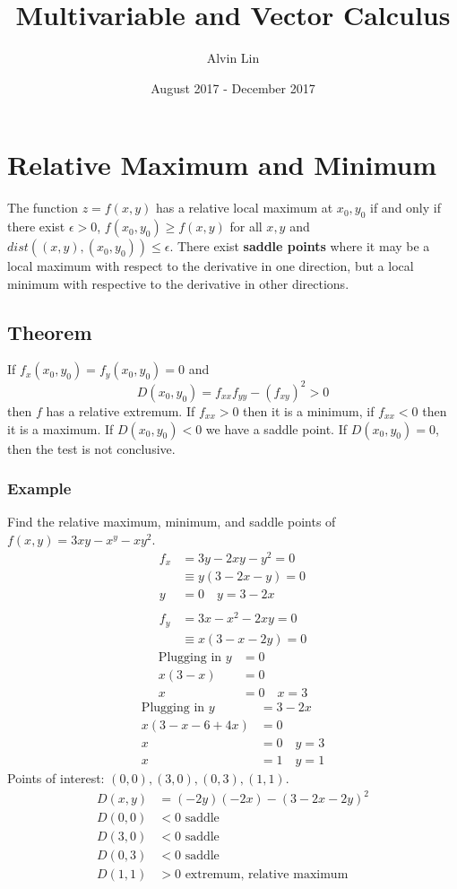 \documentclass[letterpaper, 12pt]{math}
\title{Multivariable and Vector Calculus}
\author{Alvin Lin}
\date{August 2017 - December 2017}
\begin{document}
\maketitle

\section*{Relative Maximum and Minimum}
The function \( z = f(x,y) \) has a relative local maximum at \( x_0, y_0 \)
if and only if there exist \( \epsilon > 0 \), \( f(x_0,y_0)\ge f(x,y) \) for
all \( x,y \) and \( dist((x,y), (x_0,y_0))\le\epsilon \). There exist
\textbf{saddle points} where it may be a local maximum with respect to the
derivative in one direction, but a local minimum with respective to the
derivative in other directions.

\subsection*{Theorem}
If \( f_x(x_0,y_0) = f_y(x_0,y_0) = 0 \) and
\[ D(x_0,y_0) = f_{xx}f_{yy}-(f_{xy})^2 > 0 \]
then \( f \) has a relative extremum. If \( f_{xx} > 0 \) then it is a
minimum, if \( f_{xx} < 0 \) then it is a maximum. If \( D(x_0,y_0) < 0 \)
we have a saddle point. If \( D(x_0,y_0) = 0 \), then the test is not
conclusive.

\subsubsection*{Example}
Find the relative maximum, minimum, and saddle points of \( f(x,y) =
3xy-x^y-xy^2 \).
\begin{align*}
  f_x &= 3y-2xy-y^2 = 0 \\
  &\equiv y(3-2x-y) = 0 \\
  y &= 0 \quad y = 3-2x \\ \\
  f_y &= 3x-x^2-2xy = 0 \\
  &\equiv x(3-x-2y) = 0
\end{align*}
\begin{align*}
  \text{Plugging in } y &= 0 \\
  x(3-x) &= 0 \\
  x &= 0 \quad x = 3
\end{align*}
\begin{align*}
  \text{Plugging in } y &= 3-2x \\
  x(3-x-6+4x) &= 0 \\
  x &= 0 \quad y = 3 \\
  x &= 1 \quad y = 1
\end{align*}
Points of interest: \( (0,0), (3,0), (0,3), (1,1) \).
\begin{align*}
  D(x,y) &= (-2y)(-2x)-(3-2x-2y)^2 \\
  D(0,0) &< 0 \text{ saddle} \\
  D(3,0) &< 0 \text{ saddle} \\
  D(0,3) &< 0 \text{ saddle} \\
  D(1,1) &> 0 \text{ extremum, relative maximum}
\end{align*}
\end{document}
